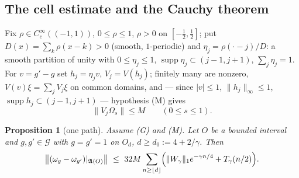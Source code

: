 \documentclass[11pt,a4paper]{article}
\theoremstyle{plain}
\newtheorem{proposition}[theorem]{Proposition}
\theoremstyle{definition}
\newcommand{\A}{\mathfrak{A}}
\newcommand{\G}{\mathcal{G}}
\newcommand{\Om}{\Omega}
\DeclareMathOperator{\supp}{supp}
\begin{document}
\subsection{The cell estimate and the Cauchy theorem}

Fix $\rho\in C_c^\infty((-1,1))$, $0\le\rho\le1$, $\rho>0$ on $[-\frac12,\frac12]$; put
$D(x)=\sum_k\rho(x-k)>0$ (smooth, $1$-periodic) and $\eta_j=\rho(\cdot-j)/D$: a smooth
partition of unity with $0\le\eta_j\le1$, $\supp\eta_j\subset(j-1,j+1)$, $\sum_j\eta_j=1$.
For $v=g'-g$ set $h_j=\eta_jv$, $V_j=V(h_j)$; finitely many are nonzero,
$V(v)\xi=\sum_jV_j\xi$ on common domains, and --- since $|v|\le1$, $\|h_j\|_\infty\le1$,
$\supp h_j\subset(j-1,j+1)$ --- hypothesis \textup{(M)} gives
\begin{equation}\label{eq:cellmoment-main}
  \|V_j\Om_s\|\le M\qquad(0\le s\le1).
\end{equation}

\begin{proposition}[one path]\label{prop:path-main}
Assume \textup{(G)} and \textup{(M)}. Let $O$ be a bounded interval and $g,g'\in\G$ with
$g=g'=1$ on $O_d$, $d\ge d_0:=4+2/\gamma$. Then
\begin{equation}\label{eq:pathbound-main}
  \bigl\|(\omega_g-\omega_{g'})|_{\A(O)}\bigr\|
  \ \le\ 32M\sum_{n\ge\lfloor d\rfloor}
  \Bigl(\|W_\gamma\|_1e^{-\gamma n/4}+T_\gamma(n/2)\Bigr).
\end{equation}
\end{proposition}
\end{document}
